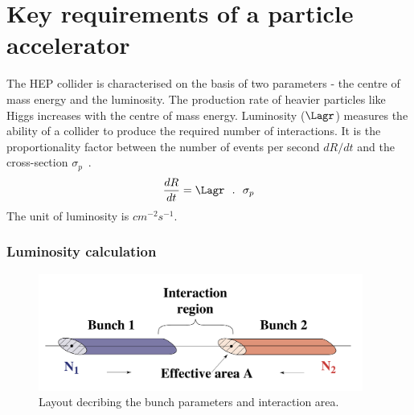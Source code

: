 \section{Key requirements of a particle accelerator} %
\label{sub:few_key_requirements}

The HEP collider is characterised on the basis of two parameters - the centre of mass energy and the luminosity. 
The production rate of heavier particles like Higgs increases with the centre of mass energy. 
Luminosity ({$\Lagr$}) measures the ability of a collider to produce the required number of interactions. It is the proportionality factor between the number of events per second $dR/dt$ and the cross-section $\sigma_p$~\cite{Muratori2006}.
\begin{equation}
	\frac{dR}{dt} = \Lagr ~~.~~ \sigma_p
\end{equation}
The unit of luminosity is $cm^{-2}s^{-1}$.

\subsubsection{Luminosity calculation} %
\label{ssub:luminosity_calculation}


\begin{figure}[!htbp]
	\centering
	\includegraphics[width=0.95\textwidth]{figures/LHC/Luminosity_calculation.jpg}
	\caption{Layout decribing the bunch parameters and interaction area.}
	\label{fig:lumi}
\end{figure}


